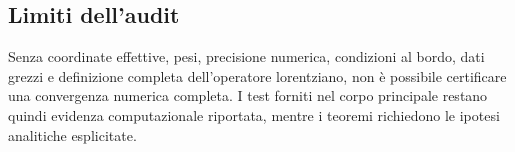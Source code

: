 \subsection{Limiti dell'audit}

Senza coordinate effettive, pesi, precisione numerica, condizioni al
bordo, dati grezzi e definizione completa dell'operatore lorentziano,
non è possibile certificare una convergenza numerica completa. I test
forniti nel corpo principale restano quindi evidenza computazionale
riportata, mentre i teoremi richiedono le ipotesi analitiche esplicitate.
